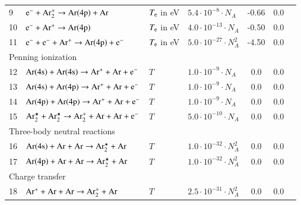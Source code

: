 \documentclass{warpdoc}
\begin{document}
\begin{table}[!ht]
\begin{threeparttable}
\begin{tabular*}{1.05\textwidth}{l@{\extracolsep{\fill}}lllccr}
   9  & $\rm e^- +Ar_2^+ \rightarrow Ar(4p) + Ar$
       & $T_{\rm e}$  in eV
       & $5.4\cdot10^{-8}\cdot N_A$
                   &-0.66
       &0.0   
       & \cite{jof:2007:arakoni} \\

          10  & $\rm e^- +Ar^+ \rightarrow Ar(4p) $
       & $T_{\rm e}$ in eV
       & $4.0\cdot10^{-13}\cdot N_A$
               &-0.50
       &0.0   
       & \cite{jof:2007:arakoni} \\

       
          11 & $\rm e^- + e^- +Ar^+ \rightarrow Ar(4p) + e^- $
       & $T_{\rm e}$ in eV
       & $5.0\cdot10^{-27}\cdot N_A^2$ 
        &-4.50
       &0.0   
       & \cite{jof:2007:arakoni} \\

   \midrule
\multicolumn{3}{p{3cm}}{Penning ionization} 
       & 
       & 
       & \\     
   \midrule

          12 & $\rm Ar(4s) + Ar(4s) \rightarrow Ar^+ +Ar + e^- $
       & $T$ 
       & $1.0\cdot10^{-9}\cdot N_A $    
       &0.0
       &0.0       
       & \cite{jof:2007:arakoni} \\

          13 & $\rm Ar(4s) + Ar(4p) \rightarrow Ar^+ +Ar + e^- $
       & $T$ 
       & $1.0\cdot10^{-9}\cdot N_A $    
       &0.0
       &0.0
       & \cite{jof:2007:arakoni} \\

          14 & $\rm Ar(4p) + Ar(4p) \rightarrow Ar^+ +Ar + e^- $
       & $T$ 
       & $1.0\cdot10^{-9}\cdot N_A $    
       &0.0
       &0.0   
       & \cite{jof:2007:arakoni} \\


          15 & $\rm Ar_2^\star + Ar_2^\star \rightarrow Ar_2^+ +Ar + Ar + e^- $
       & $T$ 
       & $5.0\cdot10^{-10}\cdot N_A $    
       &0.0
       &0.0 
       & \cite{ieee:2003:kannari} \\
          \midrule
\multicolumn{3}{p{3cm}}{Three-body neutral reactions} 
       & 
       & 
       & \\     
   \midrule
         16 & $\rm Ar(4s) + Ar + Ar \rightarrow Ar_2^\star +Ar $
       & $T$ 
       & $1.0\cdot10^{-32}\cdot N_A^2 $    
       &0.0
       &0.0     
       & \cite{jof:2007:arakoni} \\

          17 & $\rm Ar(4p) + Ar + Ar \rightarrow Ar_2^\star +Ar $
       & $T$ 
       & $1.0\cdot10^{-32}\cdot N_A^2 $    
       &0.0
       &0.0         
       & \cite{jof:2007:arakoni} \\
          \midrule
\multicolumn{3}{p{3cm}}{Charge transfer} 
       & 
       & 
       & \\     
   \midrule
          18 & $\rm Ar^+ + Ar + Ar \rightarrow Ar_2^+ +Ar $
       & $T$ 
       & $2.5\cdot10^{-31}\cdot N_A^2$
     &0.0
       &0.0    
       & \cite{ieee:2003:kannari} \\


\end{tabular*}
\end{threeparttable}
\end{table}
\end{document}
